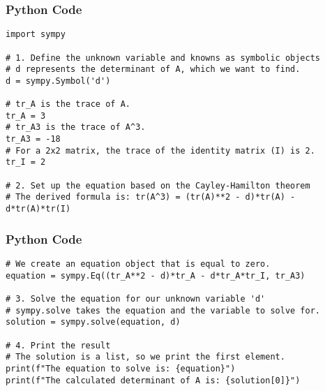 \documentclass{beamer}
\begin{document}
    \begin{frame}[fragile]
    \frametitle{Python Code}
    \begin{lstlisting}
import sympy

# 1. Define the unknown variable and knowns as symbolic objects
# d represents the determinant of A, which we want to find.
d = sympy.Symbol('d')

# tr_A is the trace of A.
tr_A = 3
# tr_A3 is the trace of A^3.
tr_A3 = -18
# For a 2x2 matrix, the trace of the identity matrix (I) is 2.
tr_I = 2

# 2. Set up the equation based on the Cayley-Hamilton theorem
# The derived formula is: tr(A^3) = (tr(A)**2 - d)*tr(A) - d*tr(A)*tr(I)
    \end{lstlisting}
    \end{frame}
    \begin{frame}[fragile]
    \frametitle{Python Code}
    \begin{lstlisting}
# We create an equation object that is equal to zero.
equation = sympy.Eq((tr_A**2 - d)*tr_A - d*tr_A*tr_I, tr_A3)

# 3. Solve the equation for our unknown variable 'd'
# sympy.solve takes the equation and the variable to solve for.
solution = sympy.solve(equation, d)

# 4. Print the result
# The solution is a list, so we print the first element.
print(f"The equation to solve is: {equation}")
print(f"The calculated determinant of A is: {solution[0]}")
\end{lstlisting}
\end{frame}
\end{document}
